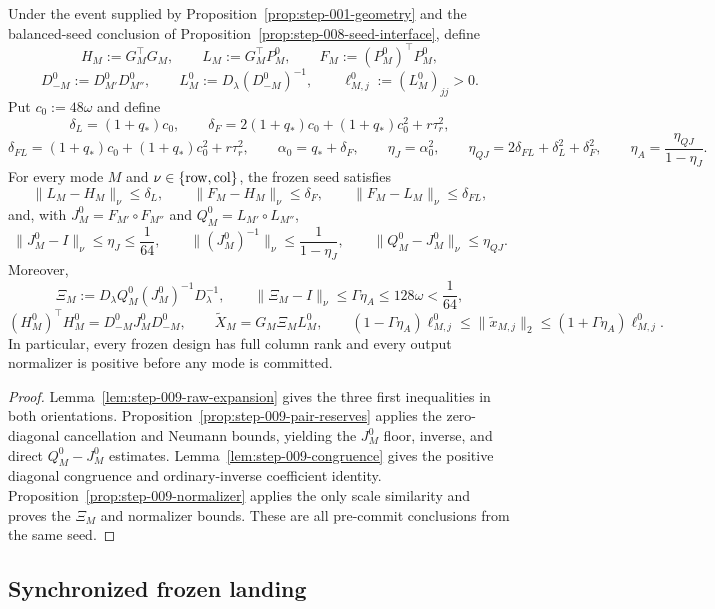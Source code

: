 \begin{proposition}
\label{prop:complete-frozen-reserve-interface}
Under the event supplied by Proposition~\ref{prop:step-001-geometry} and the
balanced-seed conclusion of Proposition~\ref{prop:step-008-seed-interface},
define
\[
H_M:=G_M^\top G_M,\qquad L_M:=G_M^\top P_M^0,\qquad
F_M:=(P_M^0)^\top P_M^0,
\]
\[
D_{-M}^0:=D_{M'}^0D_{M''}^0,\qquad
L_M^0:=D_\lambda(D_{-M}^0)^{-1},\qquad
\ell_{M,j}^0:=(L_M^0)_{jj}>0.
\]
Put $c_0:=48\omega$ and define
\[
\delta_L=(1+q_*)c_0,\qquad
\delta_F=2(1+q_*)c_0+(1+q_*)c_0^2+r\tau_r^2,
\]
\[
\delta_{FL}=(1+q_*)c_0+(1+q_*)c_0^2+r\tau_r^2,\qquad
\alpha_0=q_*+\delta_F,\qquad
\eta_J=\alpha_0^2,\qquad
\eta_{QJ}=2\delta_{FL}+\delta_L^2+\delta_F^2,\qquad
\eta_A=\frac{\eta_{QJ}}{1-\eta_J}.
\]
For every mode $M$ and $\nu\in\{{\rm row},{\rm col}\}$, the frozen seed
satisfies
\[
\|L_M-H_M\|_\nu\le\delta_L,\qquad
\|F_M-H_M\|_\nu\le\delta_F,\qquad
\|F_M-L_M\|_\nu\le\delta_{FL},
\]
and, with $J_M^0=F_{M'}\circ F_{M''}$ and
$Q_M^0=L_{M'}\circ L_{M''}$,
\[
\|J_M^0-I\|_\nu\le\eta_J\le\frac1{64},\qquad
\|(J_M^0)^{-1}\|_\nu\le\frac1{1-\eta_J},\qquad
\|Q_M^0-J_M^0\|_\nu\le\eta_{QJ}.
\]
Moreover,
\[
\Xi_M:=D_\lambda Q_M^0(J_M^0)^{-1}D_\lambda^{-1},\qquad
\|\Xi_M-I\|_\nu\le\Gamma\eta_A\le128\omega<\frac1{64},
\]
\[
(H_M^0)^\top H_M^0=D_{-M}^0J_M^0D_{-M}^0,\qquad
\widetilde X_M=G_M\Xi_ML_M^0,\qquad
(1-\Gamma\eta_A)\ell_{M,j}^0
\le\|\widetilde x_{M,j}\|_2
\le(1+\Gamma\eta_A)\ell_{M,j}^0.
\]
In particular, every frozen design has full column rank and every output
normalizer is positive before any mode is committed.

\begin{proof}
Lemma~\ref{lem:step-009-raw-expansion} gives the three first inequalities in
both orientations. Proposition~\ref{prop:step-009-pair-reserves} applies the
zero-diagonal cancellation and Neumann bounds, yielding the $J_M^0$ floor,
inverse, and direct $Q_M^0-J_M^0$ estimates. Lemma~\ref{lem:step-009-congruence}
gives the positive diagonal congruence and ordinary-inverse coefficient
identity. Proposition~\ref{prop:step-009-normalizer} applies the only scale
similarity and proves the $\Xi_M$ and normalizer bounds. These are all
pre-commit conclusions from the same seed.
\end{proof}
\end{proposition}

\subsection{Synchronized frozen landing}\label{app:step-010}

